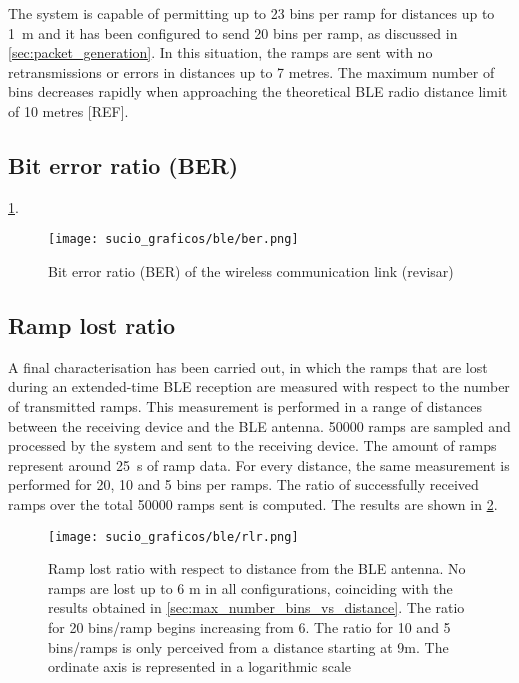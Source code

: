 The system is capable of permitting up to 23 bins per ramp for distances up to \SI{1}{\metre} and it has been configured to send 20 bins per ramp, as discussed in \cref{sec:packet_generation}. In this situation, the ramps are sent with no retransmissions or errors in distances up to 7 metres. The maximum number of bins decreases rapidly when approaching the theoretical BLE radio distance limit of 10 metres [REF].

\subsection{Bit error ratio (BER)}

\cref{fig:firmware_ble_char_ber}.



\begin{figure}[ht]
	\centering
	\texttt{[image: sucio\_graficos/ble/ber.png]}
	\caption{Bit error ratio (BER) of the wireless communication link (revisar)}
	\label{fig:firmware_ble_char_ber}
\end{figure}
\subsection{Ramp lost ratio}

A final characterisation has been carried out, in which the ramps that are lost during an extended-time BLE reception are measured with respect to the number of transmitted ramps. This measurement is performed in a range of distances between the receiving device and the BLE antenna. 50000 ramps are sampled and processed by the system and sent to the receiving device. The amount of ramps represent around \SI{25}{\second} of ramp data. For every distance, the same measurement is performed for 20, 10 and 5 bins per ramps. The ratio of successfully received ramps over the total 50000 ramps sent is computed. The results are shown in \cref{fig:firmware_ble_char_rlr}.

\begin{figure}[ht]
	\centering
	\texttt{[image: sucio\_graficos/ble/rlr.png]}
	\caption{Ramp lost ratio with respect to distance from the BLE antenna. No ramps are lost up to 6 m in all configurations, coinciding with the results obtained in \cref{sec:max_number_bins_vs_distance}. The ratio for 20 bins/ramp begins increasing from 6. The ratio for 10 and 5 bins/ramps is only perceived from a distance starting at 9m. The ordinate axis is represented in a logarithmic scale}
	\label{fig:firmware_ble_char_rlr}
\end{figure}





